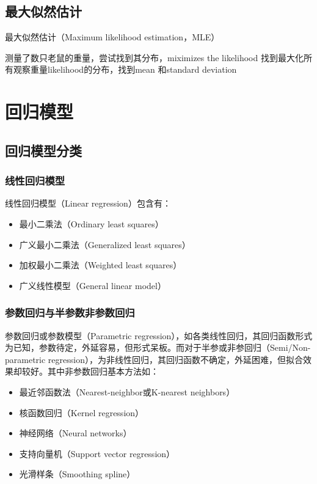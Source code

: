 \documentclass[11pt]{article}
\begin{document}
\subsection{最大似然估计}
    
最大似然估计（Maximum likelihood estimation，MLE）

测量了数只老鼠的重量，尝试找到其分布，miximizes the likelihood 找到最大化所有观察重量likelihood的分布，找到mean 和standard deviation

\section{回归模型}

\subsection{回归模型分类}

\subsubsection*{线性回归模型}
线性回归模型（Linear regression）包含有：
\begin{itemize}
    \item 最小二乘法（Ordinary least squares）
    \item 广义最小二乘法（Generalized least squares）
    \item 加权最小二乘法（Weighted least squares）
    \item 广义线性模型（General linear model）
\end{itemize}

\subsubsection*{参数回归与半参数非参数回归}

参数回归或参数模型（Parametric regression），如各类线性回归，其回归函数形式为已知，参数待定，外延容易，但形式呆板。而对于半参或非参回归（Semi/Non-parametric regression），为非线性回归，其回归函数不确定，外延困难，但拟合效果却较好。其中非参数回归基本方法如：
\begin{itemize}
    \item 最近邻函数法（Nearest-neighbor或K-nearest neighbors）
    \item 核函数回归（Kernel regression）
    \item 神经网络（Neural networks）
    \item 支持向量机（Support vector regression）
    \item 光滑样条（Smoothing spline）
\end{itemize}
\end{document}
